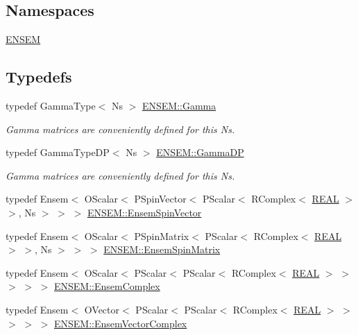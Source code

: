 \subsection*{Namespaces}
\begin{DoxyCompactItemize}
\item 
 \mbox{\hyperlink{namespaceENSEM}{E\+N\+S\+EM}}
\end{DoxyCompactItemize}
\subsection*{Typedefs}
\begin{DoxyCompactItemize}
\item 
typedef Gamma\+Type$<$ Ns $>$ \mbox{\hyperlink{group__defs_ga0cf937e0a1681829b6b69762c6b8427b}{E\+N\+S\+E\+M\+::\+Gamma}}
\begin{DoxyCompactList}\small\item\em Gamma matrices are conveniently defined for this Ns. \end{DoxyCompactList}\item 
typedef Gamma\+Type\+DP$<$ Ns $>$ \mbox{\hyperlink{group__defs_ga318782f1c57403a3bb07a1f4e15345c9}{E\+N\+S\+E\+M\+::\+Gamma\+DP}}
\begin{DoxyCompactList}\small\item\em Gamma matrices are conveniently defined for this Ns. \end{DoxyCompactList}\item 
typedef Ensem$<$ O\+Scalar$<$ P\+Spin\+Vector$<$ P\+Scalar$<$ R\+Complex$<$ \mbox{\hyperlink{adat-devel_2lib_2ensem_2ensem__precision_8h_ad013361bb53824d5957cb0b391c72290}{R\+E\+AL}} $>$ $>$, Ns $>$ $>$ $>$ \mbox{\hyperlink{group__defs_gac817a4995f4c9a955aa536e3e9879184}{E\+N\+S\+E\+M\+::\+Ensem\+Spin\+Vector}}
\item 
typedef Ensem$<$ O\+Scalar$<$ P\+Spin\+Matrix$<$ P\+Scalar$<$ R\+Complex$<$ \mbox{\hyperlink{adat-devel_2lib_2ensem_2ensem__precision_8h_ad013361bb53824d5957cb0b391c72290}{R\+E\+AL}} $>$ $>$, Ns $>$ $>$ $>$ \mbox{\hyperlink{group__defs_gafa28f0d9727eaa39fea6e3089c22ba33}{E\+N\+S\+E\+M\+::\+Ensem\+Spin\+Matrix}}
\item 
typedef Ensem$<$ O\+Scalar$<$ P\+Scalar$<$ P\+Scalar$<$ R\+Complex$<$ \mbox{\hyperlink{adat-devel_2lib_2ensem_2ensem__precision_8h_ad013361bb53824d5957cb0b391c72290}{R\+E\+AL}} $>$ $>$ $>$ $>$ $>$ \mbox{\hyperlink{group__defs_ga5d1497403fdbca6ecdeec3d05de9a223}{E\+N\+S\+E\+M\+::\+Ensem\+Complex}}
\item 
typedef Ensem$<$ O\+Vector$<$ P\+Scalar$<$ P\+Scalar$<$ R\+Complex$<$ \mbox{\hyperlink{adat-devel_2lib_2ensem_2ensem__precision_8h_ad013361bb53824d5957cb0b391c72290}{R\+E\+AL}} $>$ $>$ $>$ $>$ $>$ \mbox{\hyperlink{group__defs_ga13b984332760feb8bc9c8f1071ade9ef}{E\+N\+S\+E\+M\+::\+Ensem\+Vector\+Complex}}

\end{DoxyCompactItemize}
